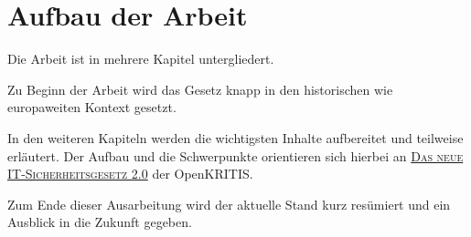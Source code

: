 \section{Aufbau der Arbeit}\label{sec:aufbau-der-arbeit}
Die Arbeit ist in mehrere Kapitel untergliedert.

Zu Beginn der Arbeit wird das Gesetz knapp in den historischen wie europaweiten Kontext gesetzt.

In den weiteren Kapiteln werden die wichtigsten Inhalte aufbereitet und teilweise erläutert.
Der Aufbau und die Schwerpunkte orientieren sich hierbei an
\href{https://www.openkritis.de/it-sicherheitsgesetz/ausblick-it-sicherheitsgesetz-2-0.html}{\textsc{Das neue IT-Sicherheitsgesetz 2.0}}
der OpenKRITIS\@.

Zum Ende dieser Ausarbeitung wird der aktuelle Stand kurz resümiert und ein Ausblick in die Zukunft gegeben.
